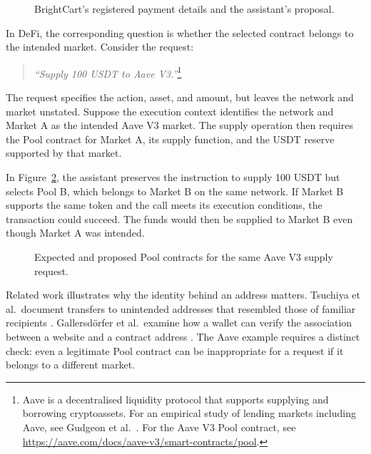 \begin{figure}[H]
    \centering
    
    \caption{BrightCart's registered payment details and the assistant's
    proposal.}
    \label{fig:motivation_scenario}
\end{figure}

In DeFi, the corresponding question is whether the selected contract
belongs to the intended market. Consider the request:

\begin{quote}
\textit{``Supply 100 USDT to Aave V3.''}\footnote{Aave is a
decentralised liquidity protocol that supports supplying and borrowing
cryptoassets. For an empirical study of lending markets including Aave,
see Gudgeon et al.~\cite{gudgeonLoanableFunds2020}. For the Aave V3 Pool
contract, see \url{https://aave.com/docs/aave-v3/smart-contracts/pool}.}
\end{quote}

The request specifies the action, asset, and amount, but leaves the
network and market unstated. Suppose the execution context identifies
the network and Market A as the intended Aave V3 market. The supply
operation then requires the Pool contract for Market A, its supply
function, and the USDT reserve supported by that market.

In Figure~\ref{fig:aave_supply_comparison}, the assistant preserves
the instruction to supply 100 USDT but selects Pool B, which belongs
to Market B on the same network. If Market B supports the same token
and the call meets its execution conditions, the transaction could
succeed. The funds would then be supplied to Market B even though
Market A was intended.

\begin{figure}[htbp]
    \centering
    
    \caption{Expected and proposed Pool contracts for the same Aave V3
    supply request.}
    \label{fig:aave_supply_comparison}
\end{figure}

Related work illustrates why the identity behind an address matters.
Tsuchiya et al.\ document transfers to unintended addresses that
resembled those of familiar recipients
\cite{tsuchiyaAddressPoisoning2025}. Gallersd\"orfer et al.\ examine
how a wallet can verify the association between a website and a
contract address \cite{gallersdorferMetaMaskTLS2022}. The Aave example
requires a distinct check: even a legitimate Pool contract can be
inappropriate for a request if it belongs to a different market.

